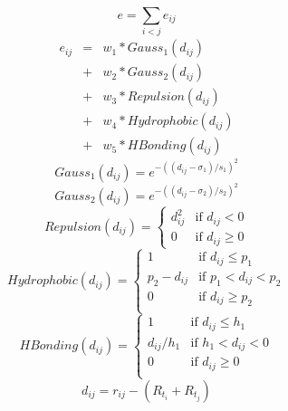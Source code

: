 \documentclass[a4paper,12pt]{article}
\begin{document}
\begin{equation}
\label{eqn:e}
e = \sum_{i < j} e_{ij}
\end{equation}
\begin{eqnarray}
\label{eqn:eij}
e_{ij} &=& w_1 * Gauss_1(d_{ij}) \nonumber \\
       &+& w_2 * Gauss_2(d_{ij}) \nonumber \\
       &+& w_3 * Repulsion(d_{ij}) \nonumber \\
       &+& w_4 * Hydrophobic(d_{ij}) \nonumber \\
       &+& w_5 * HBonding(d_{ij})
\end{eqnarray}
\begin{equation}
\label{eqn:Gauss1}
Gauss_1(d_{ij}) = e^{-((d_{ij} - \sigma_1) / s_1)^2}
\end{equation}
\begin{equation}
\label{eqn:Gauss2}
Gauss_2(d_{ij}) = e^{-((d_{ij} - \sigma_2) / s_2)^2}
\end{equation}
\begin{equation}
\label{eqn:Repulsion}
Repulsion(d_{ij}) =
\begin{cases}
d_{ij}^2 & \text{if } d_{ij} < 0\\
0 &\text{if } d_{ij} \geq 0
\end{cases}
\end{equation}
\begin{equation}
\label{eqn:Hydrophobic}
Hydrophobic(d_{ij}) =
\begin{cases}
1 & \text{if } d_{ij} \leq p_1\\
p_2 - d_{ij} & \text{if } p_1 < d_{ij} < p_2\\
0 & \text{if } d_{ij} \geq p_2\\
\end{cases}
\end{equation}
\begin{equation}
\label{eqn:HBonding}
HBonding(d_{ij}) =
\begin{cases}
1 & \text{if } d_{ij} \leq h_1\\
d_{ij} / h_1 & \text{if } h_1 < d_{ij} < 0\\
0 & \text{if } d_{ij} \geq 0\\
\end{cases}
\end{equation}
\begin{equation}
\label{eqn:dij}
d_{ij} = r_{ij} - (R_{t_i} + R_{t_j})
\end{equation}
\end{document}
